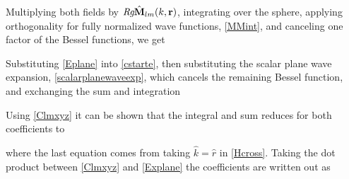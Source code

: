 Multiplying both fields by $\textit{Rg}\hat{\mathbf{M}}_{lm}(k,\mathbf{r})$, integrating over the sphere, applying orthogonality for fully normalized wave functions, \eqref{MMint}, and canceling one factor of the Bessel functions, we get 
%

Substituting \eqref{Eplane} into \eqref{cstarte}, then substituting the scalar plane wave expansion, \eqref{scalarplanewaveexp}, which cancels the remaining Bessel function, and exchanging the sum and integration




Using \eqref{Clmxyz} it can be shown that the integral and sum reduces for both coefficients to  

\noindent where the last equation comes from taking $\hat{k} = \hat{r}$ in \eqref{Hcross}. Taking the dot product between \eqref{Clmxyz} and \eqref{Explane} the coefficients are written out as 

